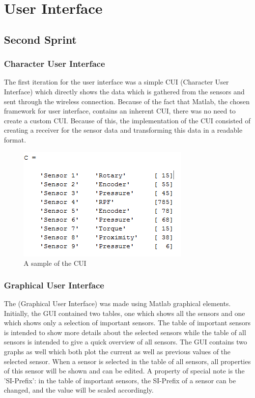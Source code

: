 \section{User Interface}

\subsection{Second Sprint}

\subsubsection{Character User Interface}

The first iteration for the user interface was a simple CUI (Character User Interface) which directly shows the data which is gathered from the sensors and sent through the wireless connection. Because of the fact that Matlab, the chosen framework for user interface, contains an inherent CUI, there was no need to create a custom CUI. Because of this, the implementation of the CUI consisted of creating a receiver for the sensor data and transforming this data in a readable format. 

\begin{figure}[H]
	\centering
	\includegraphics[width=.75\textwidth]{images/CUI}
	\caption{A sample of the CUI} 
	\label{fig:CUIV1}
\end{figure} 

\subsubsection{Graphical User Interface}

The (Graphical User Interface) was made using Matlab graphical elements. Initially, the GUI contained two tables, one which shows all the sensors and one which shows only a selection of important sensors. 
The table of important sensors is intended to show more details about the selected sensors while the table of all sensors is intended to give a quick overview of all sensors. The GUI contains two graphs as well which both plot the current as well as previous values of the selected sensor. When a sensor is selected in the table of all sensors, all properties of this sensor will be shown and can be edited. A property of special note is the 'SI-Prefix': in the table of important sensors, the SI-Prefix of a sensor can be changed, and the value will be scaled accordingly. 


